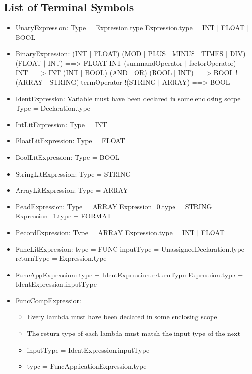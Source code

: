 \chapter{}

\section{List of Terminal Symbols} \label{sec:symbols}

\begin{itemize}
	\item UnaryExpression:
		\subitem Type = Expression.type
		\subitem Expression.type = INT $|$ FLOAT $|$ BOOL
	\item BinaryExpression:
		\subitem (INT $|$ FLOAT) (MOD $|$ PLUS $|$ MINUS $|$ TIMES $|$ DIV) (FLOAT $|$ INT) ==> FLOAT
		\subitem INT (summandOperator $|$ factorOperator) INT ==> INT
		\subitem (INT $|$ BOOL) (AND $|$ OR) (BOOL $|$ INT) ==> BOOL
		\subitem !(ARRAY $|$ STRING) termOperator !(STRING $|$ ARRAY) ==> BOOL
	\item IdentExpression:
		\subitem Variable must have been declared in some enclosing scope
		\subitem Type = Declaration.type
	\item IntLitExpression:
		\subitem Type = INT
	\item FloatLitExpression:
		\subitem Type = FLOAT
	\item BoolLitExpression:
		\subitem Type = BOOL
	\item StringLitExpression:
		\subitem Type = STRING
	\item ArrayLitExpression:
		\subitem Type = ARRAY
	\item ReadExpression:
		\subitem Type = ARRAY
		\subitem Expression_0.type = STRING
		\subitem Expression_1.type = FORMAT
	\item RecordExpression:
		\subitem Type = ARRAY
		\subitem Expression.type = INT $|$ FLOAT
	\item FuncLitExpression:
		\subitem type = FUNC
		\subitem inputType = UnassignedDeclaration.type
		\subitem returnType = Expression.type
	\item FuncAppExpression:
		\subitem type = IdentExpression.returnType
		\subitem Expression.type = IdentExpression.inputType
	\item FuncCompExpression:
	\begin{itemize}
		\item Every lambda must have been declared in some enclosing scope
		\item The return type of each lambda must match the input type of the next 
		\item inputType = IdentExpression.inputType
		\item type = FuncApplicationExpression.type
	\end{itemize}
\end{itemize}
